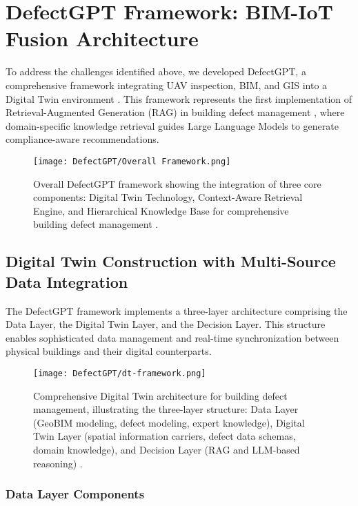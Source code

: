 \section{DefectGPT Framework: BIM-IoT Fusion Architecture}

To address the challenges identified above, we developed DefectGPT, a comprehensive framework integrating UAV inspection, BIM, and GIS into a Digital Twin environment \cite{zhang2024automated}. This framework represents the first implementation of Retrieval-Augmented Generation (RAG) in building defect management \cite{lewis2020retrieval,fan2023retrieval}, where domain-specific knowledge retrieval guides Large Language Models to generate compliance-aware recommendations.

\begin{figure}[htbp]
    \centering
    \texttt{[image: DefectGPT/Overall Framework.png]}
    \caption{Overall DefectGPT framework showing the integration of three core components: Digital Twin Technology, Context-Aware Retrieval Engine, and Hierarchical Knowledge Base for comprehensive building defect management \cite{zhang2024automated}.}
    \label{fig:defectgpt-framework}
\end{figure}

\subsection{Digital Twin Construction with Multi-Source Data Integration}

The DefectGPT framework implements a three-layer architecture comprising the Data Layer, the Digital Twin Layer, and the Decision Layer. This structure enables sophisticated data management and real-time synchronization between physical buildings and their digital counterparts.

\begin{figure}[htbp]
    \centering
    \texttt{[image: DefectGPT/dt-framework.png]}
    \caption{Comprehensive Digital Twin architecture for building defect management, illustrating the three-layer structure: Data Layer (GeoBIM modeling, defect modeling, expert knowledge), Digital Twin Layer (spatial information carriers, defect data schemas, domain knowledge), and Decision Layer (RAG and LLM-based reasoning) \cite{zhang2024automated}.}
    \label{fig:dt-architecture}
\end{figure}

\subsubsection{Data Layer Components}

